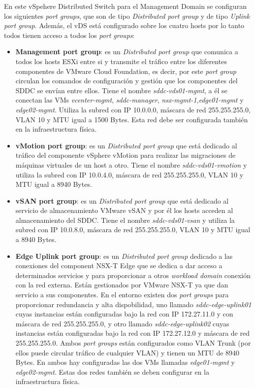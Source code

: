 En este vSpehere Distributed Switch para el Management Domain se configuran los siguientes \textit{port groups}, que son de tipo \textit{Distributed port group} y de tipo \textit{Uplink port group}. Además, el vDS está configurado sobre los cuatro hosts por lo tanto todos tienen acceso a todos los \textit{port groups}:
\begin{itemize}
       
        \item \textbf{Management port group}: es un \textit{Distributed port group} que comunica a todos los hosts ESXi entre si y transmite el tráfico entre los diferentes componentes de VMware Cloud Foundation, es decir, por este \textit{port group} circulan los comandos de configuración y gestión que los componentes del SDDC se envían entre ellos. Tiene el nombre \textit{sddc-vds01-mgmt}, a él se conectan las VMs \textit{vcenter-mgmt}, \textit{sddc-manager}, \textit{nsx-mgmt-1},\textit{edge01-mgmt} y \textit{edge02-mgmt}. Utiliza la subred con IP 10.0.0.0, máscara de red 255.255.255.0, VLAN 10 y MTU igual a 1500 Bytes. Esta red debe ser configurada también en la infraestructura física.
        
        \item \textbf{vMotion port group}: es un \textit{Distributed port group} que está dedicado al tráfico del componente vSphere vMotion para realizar las migraciones de máquinas virtuales de un host a otro. Tiene el nombre \textit{sddc-vds01-vmotion} y utiliza la subred con IP 10.0.4.0, máscara de red 255.255.255.0, VLAN 10 y MTU igual a 8940 Bytes.
        
        \item \textbf{vSAN port group}: es un \textit{Distributed port group} que está dedicado al servicio de almacenamiento VMware vSAN y por él los hosts acceden al almacenamiento del SDDC. Tiene el nombre \textit{sddc-vds01-vsan} y utiliza la subred con IP 10.0.8.0, máscara de red 255.255.255.0, VLAN 10 y MTU igual a 8940 Bytes.
        
        \item \textbf{Edge Uplink port group}: es un \textit{Distributed port group} dedicado a las conexiones del component NSX-T Edge que se dedica a dar acceso a determinados servicios y para proporcionar a otros \textit{workload domain} conexión con la red externa. Están gestionados por VMware NSX-T ya que dan servicio a sus componentes. En el entorno existen dos \textit{port groups} para proporcionar redundancia y alta dispobilidad, uno llamado \textit{sddc-edge-uplink01} cuyas instancias están configuradas bajo la red con IP 172.27.11.0 y con máscara de red 255.255.255.0, y otro llamado \textit{sddc-edge-uplink02} cuyas instancias están configuradas bajo la red con IP 172.27.12.0 y máscara de red 255.255.255.0. Ambos \textit{port groups} están configurados como VLAN Trunk (por ellos puede circular tráfico de cualquier VLAN) y tienen un MTU de 8940 Bytes. En ambos hay configuradas las dos VMs llamadas \textit{edge01-mgmt} y \textit{edge02-mgmt}. Estas dos redes también se deben configurar en la infraestructura física.
        

\end{itemize}
